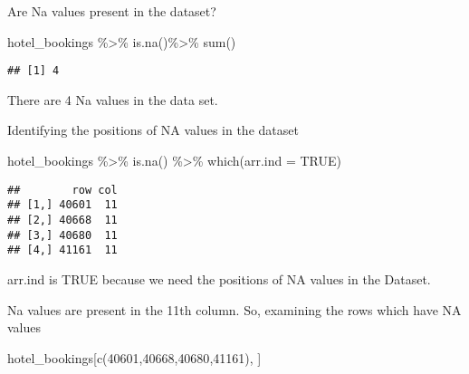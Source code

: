 \documentclass[
]{article}
\newenvironment{Shaded}{\begin{snugshade}}{\end{snugshade}}
\newcommand{\AttributeTok}[1]{\textcolor[rgb]{0.77,0.63,0.00}{#1}}
\newcommand{\ConstantTok}[1]{\textcolor[rgb]{0.00,0.00,0.00}{#1}}
\newcommand{\DecValTok}[1]{\textcolor[rgb]{0.00,0.00,0.81}{#1}}
\newcommand{\FunctionTok}[1]{\textcolor[rgb]{0.00,0.00,0.00}{#1}}
\newcommand{\NormalTok}[1]{#1}
\newcommand{\SpecialCharTok}[1]{\textcolor[rgb]{0.00,0.00,0.00}{#1}}
\begin{document}
Are Na values present in the dataset?

\begin{Shaded}
\begin{Highlighting}[]
\NormalTok{hotel\_bookings }\SpecialCharTok{\%\textgreater{}\%} \FunctionTok{is.na}\NormalTok{()}\SpecialCharTok{\%\textgreater{}\%} \FunctionTok{sum}\NormalTok{()}
\end{Highlighting}
\end{Shaded}

\begin{verbatim}
## [1] 4
\end{verbatim}

There are 4 Na values in the data set.

Identifying the positions of NA values in the dataset

\begin{Shaded}
\begin{Highlighting}[]
\NormalTok{hotel\_bookings }\SpecialCharTok{\%\textgreater{}\%} \FunctionTok{is.na}\NormalTok{() }\SpecialCharTok{\%\textgreater{}\%} \FunctionTok{which}\NormalTok{(}\AttributeTok{arr.ind =} \ConstantTok{TRUE}\NormalTok{)}
\end{Highlighting}
\end{Shaded}

\begin{verbatim}
##        row col
## [1,] 40601  11
## [2,] 40668  11
## [3,] 40680  11
## [4,] 41161  11
\end{verbatim}

arr.ind is TRUE because we need the positions of NA values in the
Dataset.

Na values are present in the 11th column. So, examining the rows which
have NA values

\begin{Shaded}
\begin{Highlighting}[]
\NormalTok{hotel\_bookings[}\FunctionTok{c}\NormalTok{(}\DecValTok{40601}\NormalTok{,}\DecValTok{40668}\NormalTok{,}\DecValTok{40680}\NormalTok{,}\DecValTok{41161}\NormalTok{), ]}
\end{Highlighting}
\end{Shaded}
\end{document}
